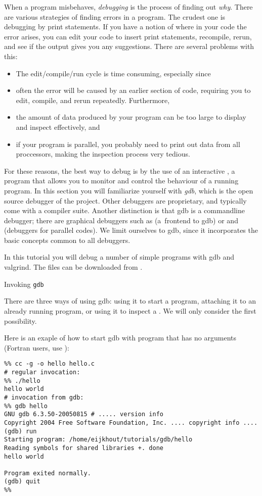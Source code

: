 
When a program misbehaves, \emph{debugging} is the process of finding
out \emph{why}.
There are various strategies of finding errors in a program.
The crudest one is debugging by print statements. If you have a
notion of where in your code the error arises, you can edit your code
to insert print statements, recompile, rerun, and see if the output
gives you any suggestions. There are several problems with this:
\begin{itemize}
\item The edit/compile/run cycle is time consuming, especially since
\item often the error will be caused by an earlier section of code,
  requiring you to edit, compile, and rerun repeatedly. Furthermore,
\item the amount of data produced by your program can be too large to
  display and inspect effectively, and
\item if your program is parallel, you probably need to print out data
  from all proccessors, making the inspection process very tedious.
\end{itemize}


For these reasons, the best way to debug is by the use of an
interactive , a program that allows you to monitor
and control the behaviour of a running program. In this section you
will familiarize yourself with
\emph{gdb}, which is the open source
debugger of the  project. Other debuggers are
proprietary, and typically come with a compiler suite. Another
distinction is that gdb is a commandline debugger; there are
graphical debuggers such as  (a~frontend to gdb) or
 and  (debuggers for parallel
codes). We limit ourselves to gdb, since it incorporates the basic
concepts common to all debuggers.

In this tutorial you will debug a number of simple programs with
gdb and valgrind. The files can be downloaded from
.

 {Invoking {\tt gdb}}

There are three ways of using gdb: using it to start a program,
attaching it to an already running program, or using it to inspect a
. We will only consider the first possibility.

Here is an exaple of how to start gdb with program that has no
arguments (Fortran users, use ):
\begin{verbatim}
%% cc -g -o hello hello.c
# regular invocation:
%% ./hello
hello world
# invocation from gdb:
%% gdb hello
GNU gdb 6.3.50-20050815 # ..... version info
Copyright 2004 Free Software Foundation, Inc. .... copyright info ....
(gdb) run
Starting program: /home/eijkhout/tutorials/gdb/hello 
Reading symbols for shared libraries +. done
hello world

Program exited normally.
(gdb) quit
%%
\end{verbatim}


